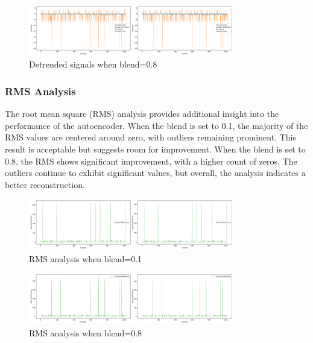 %
\begin{figure}[ht]
    \centering
    \includegraphics[width=0.8\textwidth]{static/detrended_signal_blend_08_resized.png}
    \caption{Detrended signals when blend=0.8}
    \label{fig:detrended_signal_08}
\end{figure}
%

\subsubsection{RMS Analysis} The root mean square (RMS) analysis provides additional insight into the performance of the autoencoder. When the blend is set to 0.1, the majority of the RMS values are centered around zero, with outliers remaining prominent. This result is acceptable but suggests room for improvement. When the blend is set to 0.8, the RMS shows significant improvement, with a higher count of zeros. The outliers continue to exhibit significant values, but overall, the analysis indicates a better reconstruction.
%
\begin{figure}[ht]
    \centering
    \includegraphics[width=0.8\textwidth]{static/rms_analysis_blend_01_resized.png}
    \caption{RMS analysis when blend=0.1}
    \label{fig:rms_analysis_01}
\end{figure}
%

%
\begin{figure}[ht]
    \centering
    \includegraphics[width=0.8\textwidth]{static/rms_analysis_blend_08_resized.png}
    \caption{RMS analysis when blend=0.8}
    \label{fig:rms_analysis_08}
\end{figure}
%

